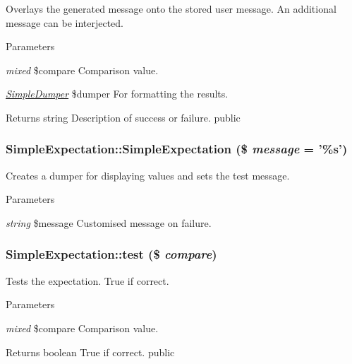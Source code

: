 \label{class_simple_expectation_afa9eddaa1f6818c6a3a6a89e3a36468a}
Overlays the generated message onto the stored user message. An additional message can be interjected. 
\begin{DoxyParams}{Parameters}
\item[{\em mixed}]\$compare Comparison value. \item[{\em \hyperlink{class_simple_dumper}{SimpleDumper}}]\$dumper For formatting the results. \end{DoxyParams}
\begin{DoxyReturn}{Returns}
string Description of success or failure.  public 
\end{DoxyReturn}
\hypertarget{class_simple_expectation_a77931c93ad58a8c51cda5a659628d705}{
\subsubsection[{SimpleExpectation}]{\setlength{\rightskip}{0pt plus 5cm}SimpleExpectation::SimpleExpectation (\$ {\em message} = {\ttfamily '\%s'})}}
\label{class_simple_expectation_a77931c93ad58a8c51cda5a659628d705}
Creates a dumper for displaying values and sets the test message. 
\begin{DoxyParams}{Parameters}
\item[{\em string}]\$message Customised message on failure. \end{DoxyParams}
\hypertarget{class_simple_expectation_aa2b98f827e7487ebe12cedb9ad39d061}{
\subsubsection[{test}]{\setlength{\rightskip}{0pt plus 5cm}SimpleExpectation::test (\$ {\em compare})}}
\label{class_simple_expectation_aa2b98f827e7487ebe12cedb9ad39d061}
Tests the expectation. True if correct. 
\begin{DoxyParams}{Parameters}
\item[{\em mixed}]\$compare Comparison value. \end{DoxyParams}
\begin{DoxyReturn}{Returns}
boolean True if correct.  public  
\end{DoxyReturn}


